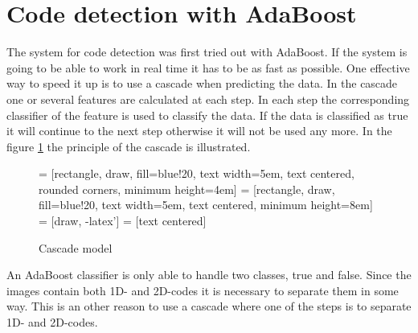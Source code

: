 \section{Code detection with AdaBoost}
\label{sec:Code detection with AdaBoost}
The system for code detection was first tried out with AdaBoost. If the system is going to be able to work in real time it has to be as fast as possible. One effective way to speed it up is to use a cascade when predicting the data. In the cascade one or several features are calculated at each step. In each step the corresponding classifier of the feature is used to classify the data. If the data is classified as true it will continue to the next step otherwise it will not be used any more. In the figure \ref{Cascade} the principle of the cascade is illustrated.

\begin{figure}[H]
\centering
{} = [rectangle, draw, fill=blue!20, 
    text width=5em, text centered, rounded corners, minimum height=4em]
 = [rectangle, draw, fill=blue!20, 
    text width=5em, text centered, minimum height=8em]
 = [draw, -latex']
 = [text centered]

\caption{Cascade model}
\label{Cascade}
\end{figure}

An AdaBoost classifier is only able to handle two classes, true and false. Since the images contain both 1D- and 2D-codes it is necessary to separate them in some way. This is an other reason to use a cascade where one of the steps is to separate 1D- and 2D-codes. 

